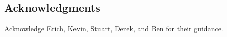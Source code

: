 \subsection*{Acknowledgments}

Acknowledge Erich, Kevin, Stuart, Derek, and Ben for their guidance.
